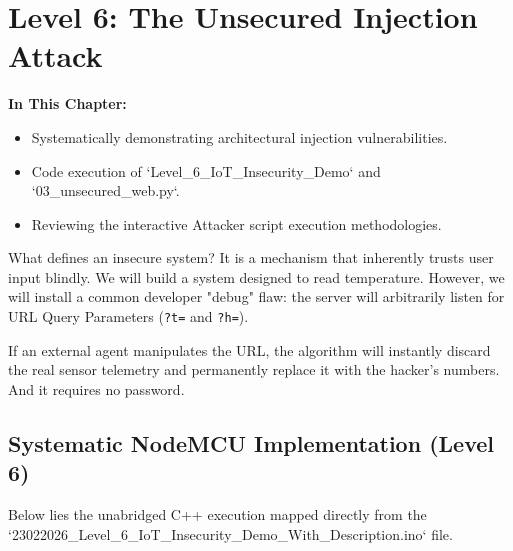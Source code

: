 \chapter{Level 6: The Unsecured Injection Attack}

\textbf{In This Chapter:}
\begin{itemize}
    \item Systematically demonstrating architectural injection vulnerabilities.
    \item Code execution of `Level\_6\_IoT\_Insecurity\_Demo` and `03\_unsecured\_web.py`.
    \item Reviewing the interactive Attacker script execution methodologies.
\end{itemize}

What defines an insecure system? It is a mechanism that inherently trusts user input blindly. We will build a system designed to read temperature. However, we will install a common developer "debug" flaw: the server will arbitrarily listen for URL Query Parameters (\texttt{?t=} and \texttt{?h=}). 

If an external agent manipulates the URL, the algorithm will instantly discard the real sensor telemetry and permanently replace it with the hacker's numbers. And it requires no password.

\section{Systematic NodeMCU Implementation (Level 6)}
Below lies the unabridged C++ execution mapped directly from the `23022026\_Level\_6\_IoT\_Insecurity\_Demo\_With\_Description.ino` file.

